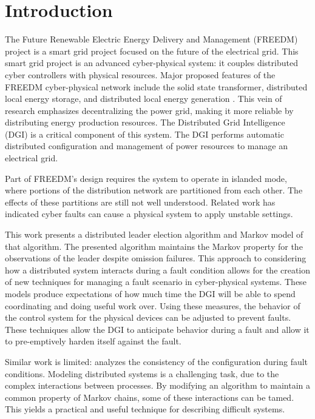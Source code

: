 
\section{Introduction}

The Future Renewable Electric Energy Delivery and Management (FREEDM) project is a smart grid project focused on the future of the electrical grid.
This smart grid project is an advanced cyber-physical system: it couples distributed cyber controllers with physical resources.
Major proposed features of the FREEDM cyber-physical network include the solid state transformer, distributed local energy storage, and distributed local energy generation \cite{FREEDMMIGRATION}.
This vein of research emphasizes decentralizing the power grid, making it more reliable by distributing energy production resources.
The Distributed Grid Intelligence (DGI) is a critical component of this system.
The DGI performs automatic distributed configuration and management of power resources to manage an electrical grid.

Part of FREEDM's design requires the system to operate in islanded mode, where portions of the distribution network are partitioned from each other.
The effects of these partitions are still not well understood.
Related work\cite{HARINI}\cite{TSG} has indicated cyber faults can cause a physical system to apply unstable settings.

This work presents a distributed leader election algorithm and Markov model of that algorithm.
The presented algorithm maintains the Markov property for the observations of the leader despite omission failures.
This approach to considering how a distributed system interacts during a fault condition allows for the creation of new techniques for managing a fault scenario in cyber-physical systems.
These models produce expectations of how much time the DGI will be able to spend coordinating and doing useful work over.
Using these measures, the behavior of the control system for the physical devices can be adjusted to prevent faults.
These techniques allow the DGI to anticipate behavior during a fault and allow it to pre-emptively harden itself against the fault.

Similar work is limited: \cite{LEADERELECTIONEVAL} analyzes the consistency of the configuration during fault conditions.
Modeling distributed systems is a challenging task, due to the complex interactions between processes.
By modifying an algorithm to maintain a common property of Markov chains, some of these interactions can be tamed.
This yields a practical and useful technique for describing difficult systems.
